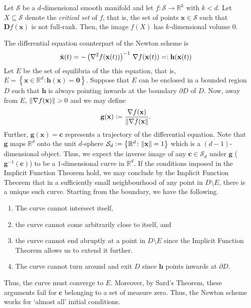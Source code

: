 \begin{thm}
    Let $\mathcal{S}$ be a $d$-dimensional smooth manifold and let $f \colon \mathcal{S} \to \mathbb{R}^k$ with $k < d$. Let $X \subseteq \mathcal{S}$ denote the \emph{critical set} of $f$, that is, the set of points $\mathbf{x} \in \mathcal{S}$ such that $\mathbf{D}f(\mathbf{x})$ is not full-rank. Then, the image $f(X)$ has $k$-dimensional volume $0$. 
\end{thm}

The differential equation counterpart of the Newton scheme is
\[
    \Dot{\mathbf{x}}(t) = - \left( \nabla^2 f(\mathbf{x}(t)) \right)^{-1} \, \nabla f(\mathbf{x}(t)) =\vcentcolon \mathbf{h}(\mathbf{x}(t))
\]  
Let $E$ be the set of equilibria of the this equation, that is, $E = \left\{ \mathbf{x} \in \mathbb{R}^d \colon \mathbf{h}(\mathbf{x}) = \mathbf{0} \right\}$. Suppose that $E$ can be enclosed in a bounded region $D$ such that $\mathbf{h}$ is always pointing inwards at the boundary $\partial D$ of $D$. Now, away from $E$, $\norm{\nabla f(\mathbf{x})} > 0$ and we may define
\[
    \mathbf{g}(\mathbf{x}) \vcentcolon= \frac{\nabla f(\mathbf{x})}{\norm{\nabla f(\mathbf{x}}}.
\]
Further, $\mathbf{g}(\mathbf{x}) = \mathbf{c}$ represents a trajectory of the differential equation. Note that $\mathbf{g}$ maps $\mathbb{R}^d$ onto the unit $d$-sphere $\mathcal{S}_d \vcentcolon= \left\{ \mathbb{R}^d \colon \norm{\mathbf{x}} = 1 \right\}$ which is a $(d-1)$-dimensional object. Thus, we expect the inverse image of any $\mathbf{c} \in \mathcal{S}_d$ under $\mathbf{g}$ ($\mathbf{g}^{-1}(\mathbf{c})$) to be a $1$-dimensional curve in $\mathbb{R}^d$. If the conditions imposed in the Implicit Function Theorem hold, we may conclude by the Implicit Function Theorem that in a sufficiently small neighbourhood of any point in $D \setminus E$, there is a unique such curve. Starting from the boundary, we have the following. 
\begin{enumerate}
    \item The curve cannot intersect itself, 
    \item the curve cannot come arbitrarily close to itself, and
    \item the curve cannot end abruptly at a point in $D \setminus E$ since the Implicit Function Theorem allows us to extend it further.
    \item The curve cannot turn around and exit $D$ since $\mathbf{h}$ points inwards at $\partial D$.
\end{enumerate}
Thus, the curve must converge to $E$. Moreover, by Sard's Theorem, these arguments fail for $\mathbf{c}$ belonging to a set of measure zero. Thus, the Newton scheme works for `almost all' initial conditions.

